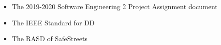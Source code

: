 \begin{itemize}
	
	\item The 2019-2020 Software Engineering 2 Project Assignment document
	\item The IEEE Standard for DD
	\item The RASD of SafeStreets
	
\end{itemize}
